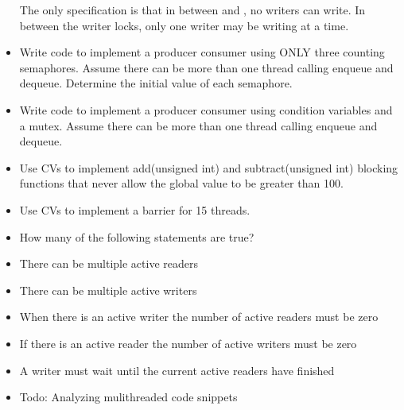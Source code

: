 \begin{itemize}
  The only specification is that in between  and , no writers can write. In between the writer locks, only one writer may be writing at a time.
\item
  Write code to implement a producer consumer using ONLY three counting semaphores. Assume there can be more than one thread calling enqueue and dequeue. Determine the initial value of each semaphore.
\item
  Write code to implement a producer consumer using condition variables and a mutex. Assume there can be more than one thread calling enqueue and dequeue.
\item
  Use CVs to implement add(unsigned int) and subtract(unsigned int) blocking functions that never allow the global value to be greater than 100.
\item
  Use CVs to implement a barrier for 15 threads.
\item
  How many of the following statements are true?
\item
There can be multiple active readers
\item
There can be multiple active writers
\item
When there is an active writer the number of active readers must be zero
\item
If there is an active reader the number of active writers must be zero
\item
A writer must wait until the current active readers have finished
\item
  Todo: Analyzing mulithreaded code snippets
\end{itemize}



